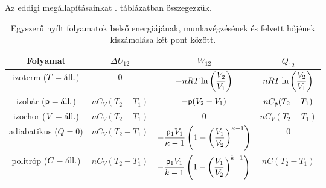 Az eddigi megállapításainkat . táblázatban összegezzük.
\begin{table}[h!]
\centering
\begin{tabular}{|c|c|c|c|} \hline
Folyamat & $\Delta U_{12}$ & $W_{12}$ & $Q_{12}$\\ \hline\hline
izoterm ($T=\textnormal{áll.}$) & 0 & $-nRT\ln\left({\dfrac{V_2}{V_1}}\right)$ & $nRT\ln\left({\dfrac{V_2}{V_1}}\right)$\\ \hline
izobár ($\mathsf p=\textnormal{áll.}$) & $nC_V(T_2-T_1)$ & $-\mathsf p(V_2-V_1)$ & $nC_\mathsf p(T_2-T_1)$ \\ \hline
izochor ($V=\textnormal{áll.}$) & $nC_V(T_2-T_1)$ & 0 & $nC_V(T_2-T_1)$\\ \hline
adiabatikus ($Q=0$) & $nC_V(T_2-T_1)$ & $- \dfrac{\mathsf p_1V_1}{\kappa-1}\left({1-\left({\dfrac{V_1}{V_2}}\right)^{\kappa-1}}\right)$ & 0\\ \hline
politróp ($C=\textnormal{áll.}$) & $nC_V(T_2-T_1)$ & $- \dfrac{\mathsf p_1V_1}{k-1}\left({1-\left({\dfrac{V_1}{V_2}}\right)^{k-1}}\right)$ & $nC(T_2-T_1)$\\ \hline
\end{tabular}
\caption{Egyszerű nyílt folyamatok belső energiájának, munkavégzésének és felvett hőjének kiszámolása két pont között.}
\label{tab:nyilt_foly}
\end{table}
